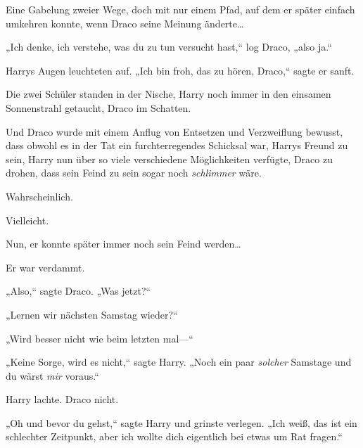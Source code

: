 Eine Gabelung zweier Wege, doch mit nur einem Pfad, auf dem er später einfach umkehren konnte, wenn Draco seine Meinung änderte…

„Ich denke, ich verstehe, was du zu tun versucht hast,“ log Draco, „also ja.“

Harrys Augen leuchteten auf. „Ich bin froh, das zu hören, Draco,“ sagte er sanft.

Die zwei Schüler standen in der Nische, Harry noch immer in den einsamen Sonnenstrahl getaucht, Draco im Schatten.

Und Draco wurde mit einem Anflug von Entsetzen und Verzweiflung bewusst, dass obwohl es in der Tat ein furchterregendes Schicksal war, Harrys Freund zu sein, Harry nun über so viele verschiedene Möglichkeiten verfügte, Draco zu drohen, dass sein Feind zu sein sogar noch \emph{schlimmer} wäre.

Wahrscheinlich.

Vielleicht.

Nun, er konnte später immer noch sein Feind werden…

Er war verdammt.

„Also,“ sagte Draco. „Was jetzt?“

„Lernen wir nächsten Samstag wieder?“

„Wird besser nicht wie beim letzten mal—“

„Keine Sorge, wird es nicht,“ sagte Harry. „Noch ein paar \emph{solcher} Samstage und du wärst \emph{mir} voraus.“

Harry lachte. Draco nicht.

„Oh und bevor du gehst,“ sagte Harry und grinste verlegen. „Ich weiß, das ist ein schlechter Zeitpunkt, aber ich wollte dich eigentlich bei etwas um Rat fragen.“

